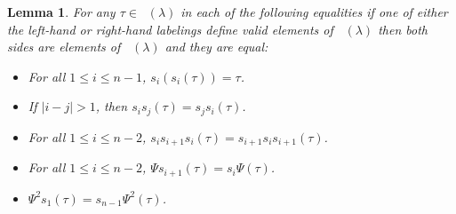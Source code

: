 \documentclass[10pt,a4paper]{amsart}
\numberwithin{equation}{section}
\newtheorem{Lemma}[Theorem]{Lemma}
\theoremstyle{definition}
\DeclareMathOperator{\PSYT}{\mathrm{PSYT}_{\geq 0}}
\begin{document}
\begin{Lemma}
For any $\tau \in \PSYT(\lambda)$ in each of the following equalities if one of either the left-hand or right-hand labelings define valid elements of $\PSYT(\lambda)$ then both sides are elements of $\PSYT(\lambda)$ and they are equal:
\begin{itemize}
\itemsep=0pt
 \item For all $1\leq i \leq n-1$, $s_i(s_i(\tau)) = \tau$.
 \item If $|i-j|>1$, then $s_is_j(\tau) = s_js_i(\tau)$.
 \item For all $1\leq i \leq n-2$, $s_is_{i+1}s_i(\tau) = s_{i+1}s_is_{i+1}(\tau)$.
 \item For all $1\leq i \leq n-2$, $\Psi s_{i+1}(\tau) = s_i\Psi(\tau)$.
 \item $\Psi^2 s_1(\tau) = s_{n-1}\Psi^2(\tau)$.
\end{itemize}

\end{Lemma}
\end{document}

